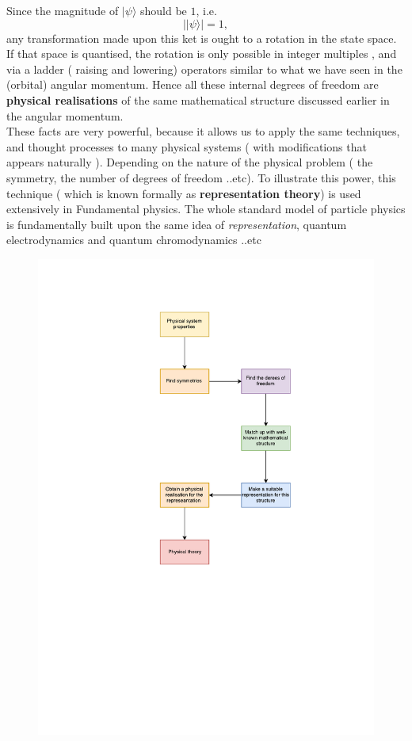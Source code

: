 Since the magnitude of $ | \psi\rangle $ should be $1$, i.e.
\[
| |\psi \rangle | = 1,
\]
any transformation made upon this ket is ought to a rotation in the state space. If that space is quantised, the rotation is only possible in  integer multiples , and via a ladder ( raising and lowering) operators similar to what we have seen in the (orbital) angular momentum. Hence all these internal degrees of freedom are \textbf{physical realisations} of the same mathematical structure discussed earlier in the angular momentum.\\
These facts are very powerful, because it allows us to apply the same techniques, and thought processes to many physical systems ( with  modifications that appears naturally ). Depending on the nature of the physical problem ( the symmetry, the number of degrees of freedom ..etc). To illustrate this power,  this technique ( which is known formally as \textbf{representation theory}) is used extensively in Fundamental physics. The whole standard model of particle physics is fundamentally  built upon the same idea of \textit{representation}, quantum electrodynamics and quantum chromodynamics ..etc
\begin{figure}
	\centering 
	\includegraphics[scale=0.9]{./figures/Rep}
	\label{rep}
\end{figure}
